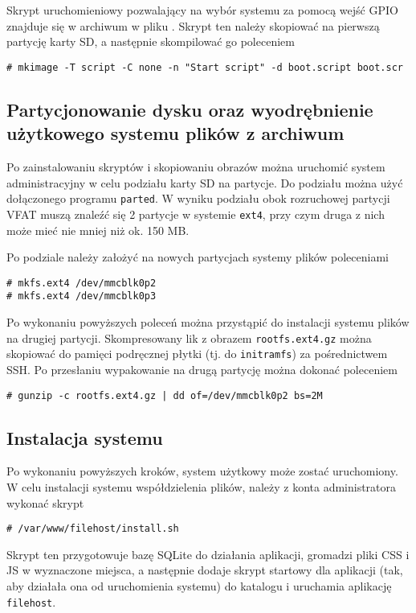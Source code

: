 \documentclass[10pt,a4paper]{article}
\begin{document}
Skrypt uruchomieniowy pozwalający na wybór systemu za pomocą wejść GPIO znajduje się
w archiwum w pliku . Skrypt ten należy skopiować na pierwszą
partycję karty SD, a następnie skompilować go poleceniem
\begin{lstlisting}
# mkimage -T script -C none -n "Start script" -d boot.script boot.scr
\end{lstlisting}

\subsection{Partycjonowanie dysku oraz wyodrębnienie użytkowego systemu plików z archiwum}

Po zainstalowaniu skryptów i skopiowaniu obrazów można uruchomić system administracyjny w celu
podziału karty SD na partycje. Do podziału można użyć dołączonego programu \texttt{parted}.
W wyniku podziału obok rozruchowej partycji VFAT muszą znaleźć się 2 partycje w systemie
\texttt{ext4}, przy czym druga z nich może mieć nie mniej niż ok. 150 MB.

Po podziale należy założyć na nowych partycjach systemy plików poleceniami
\begin{lstlisting}
# mkfs.ext4 /dev/mmcblk0p2
# mkfs.ext4 /dev/mmcblk0p3
\end{lstlisting}
Po wykonaniu powyższych poleceń można przystąpić do instalacji systemu plików na drugiej
partycji. Skompresowany lik z obrazem \texttt{rootfs.ext4.gz} można skopiować do pamięci
podręcznej płytki (tj. do \texttt{initramfs}) za pośrednictwem SSH. Po przesłaniu wypakowanie
na drugą partycję można dokonać poleceniem
\begin{lstlisting}
# gunzip -c rootfs.ext4.gz | dd of=/dev/mmcblk0p2 bs=2M
\end{lstlisting}

\subsection{Instalacja systemu}

Po wykonaniu powyższych kroków, system użytkowy może zostać uruchomiony. W celu instalacji
systemu współdzielenia plików, należy z konta administratora wykonać skrypt
\begin{lstlisting}
# /var/www/filehost/install.sh
\end{lstlisting}
Skrypt ten przygotowuje bazę SQLite do działania aplikacji, gromadzi pliki CSS i JS
w wyznaczone miejsca, a następnie dodaje skrypt startowy dla aplikacji (tak, aby działała
ona od uruchomienia systemu) do katalogu  i uruchamia aplikację
\texttt{filehost}.
\end{document}
